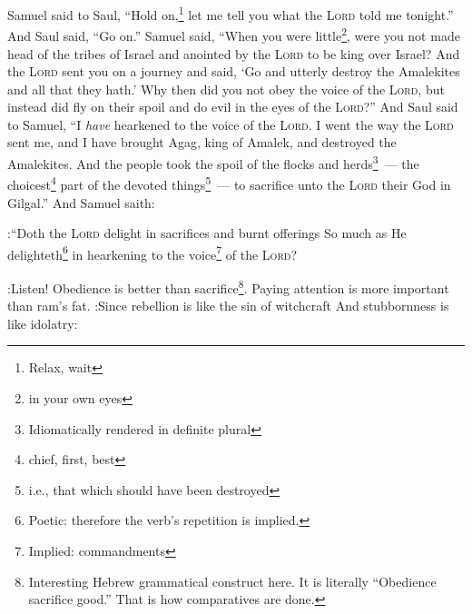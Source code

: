 \begin{inparaenum}
     Samuel said to Saul, ``Hold on,\footnote{Relax, wait} let me tell you what the \textsc{Lord} told me tonight.'' And Saul said, ``Go on.''%
     Samuel said, ``When you were little\footnote{in your own eyes}, were you not made head of the tribes of Israel and anointed by the \textsc{Lord} to be king over Israel?%
     And the \textsc{Lord} sent you on a journey and said, `Go and utterly destroy the Amalekites and all that they hath.'%
     Why then did you not obey the voice of the \textsc{Lord}, but instead did fly on their spoil and do evil in the eyes of the \textsc{Lord}?''%
     And Saul said to Samuel, ``I \emph{have} hearkened to the voice of the \textsc{Lord}. I went the way the \textsc{Lord} sent me, and I have brought Agag, king of Amalek, and destroyed the Amalekites.%
     And the people took the spoil of the flocks and herds\footnote{Idiomatically rendered in definite plural}~--- the choicest\footnote{chief, first, best} part of the devoted things\footnote{i.e., that which should have been destroyed}~--- to sacrifice unto the \textsc{Lord} their God in Gilgal.''%
     And Samuel saith:
    
:``Doth the \textsc{Lord} delight in sacrifices and burnt offerings So much as He delighteth\footnote{Poetic: therefore the verb's repetition is implied.} in hearkening to the voice\footnote{Implied: commandments} of the \textsc{Lord}?

:Listen! Obedience is better than sacrifice\footnote{Interesting Hebrew grammatical construct here. It is literally ``Obedience sacrifice good.'' That is how comparatives are done.}. Paying attention is more important than ram's fat.%
     :Since rebellion is like the sin of witchcraft And stubbornness is like idolatry:


\end{inparaenum}
